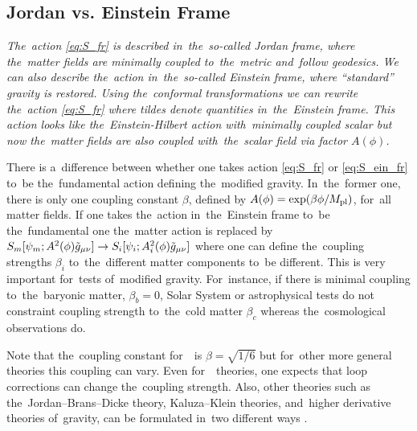 \subsection{Jordan vs. Einstein Frame}
{\itshape
The~action \eqref{eq:S_fr} is described in~the~so-called Jordan frame, where the~matter fields are minimally coupled to~the~metric and~follow geodesics. We can also describe the~action in~the~so-called Einstein frame, where ``standard'' gravity is restored. Using the~conformal transformations
we can rewrite the~action \eqref{eq:S_fr}
where tildes denote quantities in~the~Einstein frame. This action looks like the~Einstein-Hilbert action with~minimally coupled scalar but now the~matter fields are also coupled with~the~scalar field via factor $A(\phi)$. 

There is a~difference between whether one takes action \eqref{eq:S_fr} or \eqref{eq:S_ein_fr} to~be the~fundamental action defining the~modified gravity. In~the~former one, there is only one coupling constant $\beta$, defined by $A(\phi)=\exp(\beta\phi/M_{\text{\scriptsize pl}})$, for~all matter fields. If one takes the~action in~the~Einstein frame to~be the~fundamental one the~matter action is replaced by $S_m[\psi_m;A^2(\phi)\tilde{g}_{\mu\nu}]\rightarrow S_i[\psi_i;A_i^2(\phi)\tilde{g}_{\mu\nu}]$ where one can define the~coupling strengths $\beta_i$ to~the~different matter components to~be different. This is very important for~tests of~modified gravity. For~instance, if there is minimal coupling to~the~baryonic matter, $\beta_b=0$, Solar System or astrophysical tests do not constraint coupling strength to~the~cold matter $\beta_c$ whereas the~cosmological observations do.

Note that the~coupling constant for~\fR\ is $\beta=\sqrt{1/6}$ but for~other more general theories this coupling can vary. Even for~\fR\ theories, one expects that loop corrections can change the~coupling strength. Also, other theories such as the~Jordan--Brans--Dicke theory, Kaluza--Klein theories, and~higher derivative theories of~gravity, can be formulated in~two different ways \parencite{Faraoni:1998qx}.
}

